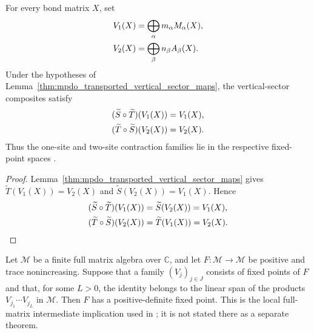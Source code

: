 \begin{lemma}
    \label{lem:mpdo_transported_vertical_sector_fixed_generators}
    \leanok
    For every bond matrix $X$, set
    \begin{align}
        V_1(X) & =\bigoplus_\alpha m_\alpha M_\alpha(X),
        \notag                                           \\
        V_2(X) & =\bigoplus_\beta n_\beta A_\beta(X).
        \notag
    \end{align}
    Under the hypotheses of
    Lemma~\ref{thm:mpdo_transported_vertical_sector_maps}, the vertical-sector
    composites satisfy
    \begin{align}
        (\widetilde S\circ\widetilde T)(V_1(X))
         & =V_1(X),
        \notag      \\
        (\widetilde T\circ\widetilde S)(V_2(X))
         & =V_2(X).
        \notag
    \end{align}
    Thus the one-site and two-site contraction families lie in the respective
    fixed-point spaces \cite[Appendix~C.4, lines~1974--1980]{Cirac2016MPDO_arXiv}.
\end{lemma}

\begin{proof}\leanok
    Lemma~\ref{thm:mpdo_transported_vertical_sector_maps} gives
    $\widetilde T(V_1(X))=V_2(X)$ and $\widetilde S(V_2(X))=V_1(X)$. Hence
    \begin{align}
        (\widetilde S\circ\widetilde T)(V_1(X))
         & =\widetilde S(V_2(X))=V_1(X),
        \notag                           \\
        (\widetilde T\circ\widetilde S)(V_2(X))
         & =\widetilde T(V_1(X))=V_2(X).
        \notag
    \end{align}
\end{proof}

\begin{lemma}
    \label{thm:positive_map_faithful_fixed_point_from_product_span}
    \leanok
    Let $\mathcal M$ be a finite full matrix algebra over $\mathbb C$, and let
    $F:\mathcal M\to\mathcal M$ be positive and trace nonincreasing. Suppose
    that a family $(V_j)_{j\in J}$ consists of fixed points of $F$ and that,
    for some $L>0$, the identity belongs to the linear span of the products
    $V_{j_1}\cdots V_{j_L}$ in $\mathcal M$. Then $F$ has a positive-definite
    fixed point. This is the local full-matrix intermediate implication used
    in \cite[Appendix~C.4, lines~1980--1995]{Cirac2016MPDO_arXiv}; it is not
    stated there as a separate theorem.
\end{lemma}

